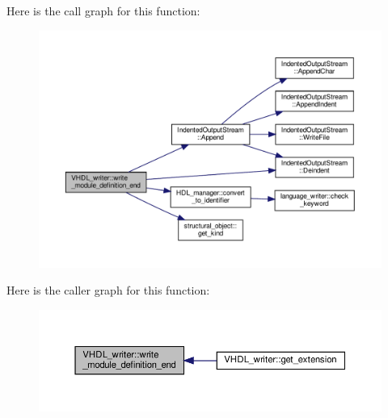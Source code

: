 Here is the call graph for this function\+:
\nopagebreak
\begin{figure}[H]
\begin{center}
\leavevmode
\includegraphics[width=350pt]{d0/d0c/structVHDL__writer_af09ad7bcc11cb6cbcc0d92957db60283_cgraph}
\end{center}
\end{figure}
Here is the caller graph for this function\+:
\nopagebreak
\begin{figure}[H]
\begin{center}
\leavevmode
\includegraphics[width=350pt]{d0/d0c/structVHDL__writer_af09ad7bcc11cb6cbcc0d92957db60283_icgraph}
\end{center}
\end{figure}
\mbox{\label{structVHDL__writer_ab73e2cc602653d648cb732dc34421854}} 
